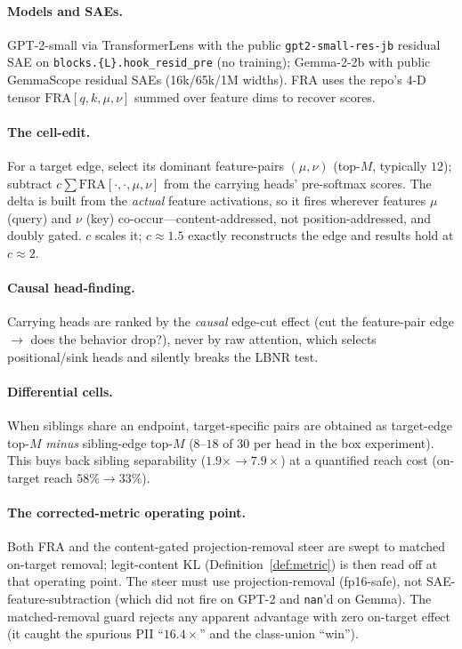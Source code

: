 \documentclass[11pt]{article}
\theoremstyle{definition}
\theoremstyle{plain}
\theoremstyle{remark}
\begin{document}
\paragraph{Models and SAEs.} GPT-2-small via TransformerLens with the public \texttt{gpt2-small-res-jb} residual SAE on \texttt{blocks.\{L\}.hook\_resid\_pre} (no training); Gemma-2-2b with public GemmaScope residual SAEs (16k/65k/1M widths). FRA uses the repo's 4-D tensor $\mathrm{FRA}[q,k,\mu,\nu]$ summed over feature dims to recover scores.

\paragraph{The cell-edit.} For a target edge, select its dominant feature-pairs $(\mu,\nu)$ (top-$M$, typically $12$); subtract $c\sum \mathrm{FRA}[\cdot,\cdot,\mu,\nu]$ from the carrying heads' pre-softmax scores. The delta is built from the \emph{actual} feature activations, so it fires wherever features $\mu$ (query) and $\nu$ (key) co-occur---content-addressed, not position-addressed, and doubly gated. $c$ scales it; $c\approx 1.5$ exactly reconstructs the edge and results hold at $c\approx 2$.

\paragraph{Causal head-finding.} Carrying heads are ranked by the \emph{causal} edge-cut effect (cut the feature-pair edge $\to$ does the behavior drop?), never by raw attention, which selects positional/sink heads and silently breaks the LBNR test.

\paragraph{Differential cells.} When siblings share an endpoint, target-specific pairs are obtained as target-edge top-$M$ \emph{minus} sibling-edge top-$M$ ($8$--$18$ of $30$ per head in the box experiment). This buys back sibling separability ($1.9\times\to 7.9\times$) at a quantified reach cost (on-target reach $58\%\to 33\%$).

\paragraph{The corrected-metric operating point.} Both FRA and the content-gated projection-removal steer are swept to matched on-target removal; legit-content KL (Definition~\ref{def:metric}) is then read off at that operating point. The steer must use projection-removal (fp16-safe), not SAE-feature-subtraction (which did not fire on GPT-2 and \texttt{nan}'d on Gemma). The matched-removal guard rejects any apparent advantage with zero on-target effect (it caught the spurious PII ``$16.4\times$'' and the class-union ``win'').
\end{document}
